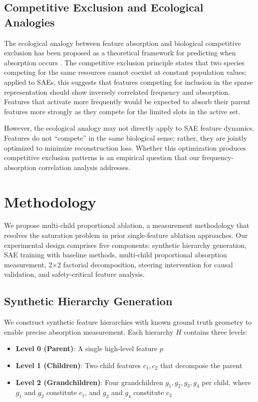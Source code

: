 \documentclass{article}
\begin{document}
\subsection{Competitive Exclusion and Ecological Analogies}

The ecological analogy between feature absorption and biological competitive exclusion has been proposed as a theoretical framework for predicting when absorption occurs \citep{korznikov2025, kalmykov2012}. The competitive exclusion principle states that two species competing for the same resources cannot coexist at constant population values; applied to SAEs, this suggests that features competing for inclusion in the sparse representation should show inversely correlated frequency and absorption. Features that activate more frequently would be expected to absorb their parent features more strongly as they compete for the limited slots in the active set.

However, the ecological analogy may not directly apply to SAE feature dynamics. Features do not ``compete'' in the same biological sense; rather, they are jointly optimized to minimize reconstruction loss. Whether this optimization produces competitive exclusion patterns is an empirical question that our frequency-absorption correlation analysis addresses.

\section{Methodology}

We propose multi-child proportional ablation, a measurement methodology that resolves the saturation problem in prior single-feature ablation approaches. Our experimental design comprises five components: synthetic hierarchy generation, SAE training with baseline methods, multi-child proportional absorption measurement, 2$\times$2 factorial decomposition, steering intervention for causal validation, and safety-critical feature analysis.

\subsection{Synthetic Hierarchy Generation}

We construct synthetic feature hierarchies with known ground truth geometry to enable precise absorption measurement. Each hierarchy $H$ contains three levels:

\begin{itemize}
\item \textbf{Level 0 (Parent)}: A single high-level feature $p$
\item \textbf{Level 1 (Children)}: Two child features $c_1, c_2$ that decompose the parent
\item \textbf{Level 2 (Grandchildren)}: Four grandchildren $g_1, g_2, g_3, g_4$ per child, where $g_1$ and $g_2$ constitute $c_1$, and $g_3$ and $g_4$ constitute $c_2$
\end{itemize}
\end{document}
